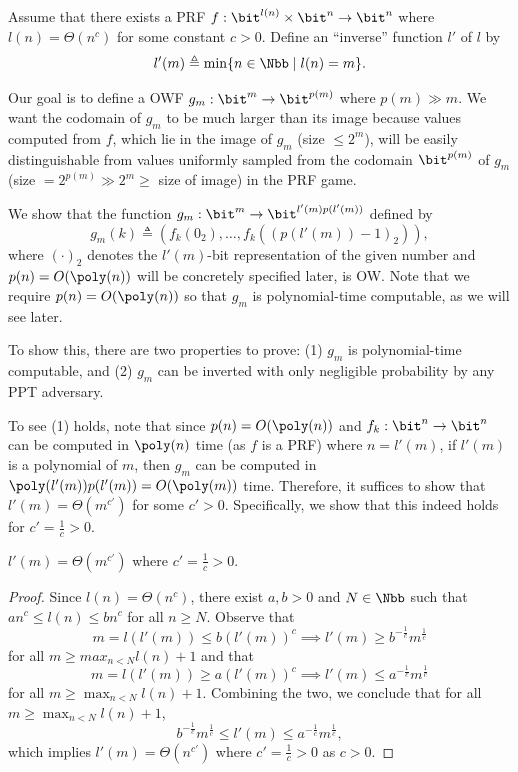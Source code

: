 \begin{answer}[a]
    Assume that there exists a PRF $f: \bit^{l(n)}\times \bit^n\to \bit^n$ where  $l(n)=\Theta(n^c)$ for some constant $c\gt 0$. Define an ``inverse'' function $l'$ of $l$ by
    \[
        l'(m)\triangleq \min\{n\in \Nbb \mid l(n)=m\}.
    \]

    \begin{intuition}
        Our goal is to define a OWF $g_m: \bit^m\to \bit^{p(m)}$ where $p(m)\gg m$. We want the codomain of $g_m$ to be much larger than its image because values computed from $f$, which lie in the image of $g_m$ (size $\le 2^m$), will be easily distinguishable from values uniformly sampled from the codomain $\bit^{p(m)}$ of $g_m$ (size $=2^{p(m)}\gg 2^{m}\ge$ size of image) in the PRF game. 
    \end{intuition}
    
    We show that the function $g_m:\bit^m\to \bit^{l'(m)p(l'(m))}$ defined by
    \[
        g_m(k) \triangleq  ({f}_{k}(0_2), \ldots , {f}_{k}((p(l'(m))-1)_2)),
    \]
    where $(\cdot)_2$ denotes the $l'(m)$-bit representation of the given number and $p(n)=O(\poly(n))$ will be concretely specified later, is OW. Note that we require $p(n)=O(\poly(n))$ so that $g_m$ is polynomial-time computable, as we will see later.

    To show this, there are two properties to prove: (1) $g_m$ is polynomial-time computable, and (2) $g_m$ can be inverted with only negligible probability by any PPT adversary. 

    To see (1) holds, note that since $p(n)=O(\poly(n))$ and $f_k:\bit^n\to\bit^n$ can be computed in $\poly(n)$ time (as $f$ is a PRF) where $n=l'(m)$, if $l'(m)$ is a polynomial of $m$, then $g_m$ can be computed in $\poly(l'(m))p(l'(m))=O(\poly(m))$ time. Therefore, it suffices to show that $l'(m)=\Theta(m^{c'})$ for some $c'\gt 0$. Specifically, we show that this indeed holds for $c'=\frac{1}{c}\gt 0$.
    \begin{claim}\label{claim:p3-1-1}
        $l'(m)=\Theta(m^{c'})$ where $c'=\frac{1}{c}\gt 0$.
    \end{claim}
    \begin{proof}
        Since $l(n)=\Theta(n^c)$, there exist $a,b\gt 0$ and $N\in\Nbb$ such that $an^c\le l(n)\le bn^c$ for all $n\ge N$. Observe that
        \[
            m=l(l'(m))\le b(l'(m))^c
            \implies  l'(m)\ge b^{-\frac{1}{c}} m^{\frac{1}{c}}
        \]
        for all $m\ge max_{n\lt N} l(n)+1$ and that
        \[
            m=l(l'(m))\ge a(l'(m))^c
            \implies  l'(m)\le a^{-\frac{1}{c}} m^{\frac{1}{c}}
        \]
        for all $m\ge \max_{n\lt N} l(n)+1$.
        Combining the two, we conclude that for all $m\ge \max_{n\lt N} l(n) +1$,
        \[
            b^{-\frac{1}{c}} m^{\frac{1}{c}}\le l'(m)\le a^{-\frac{1}{c}} m^{\frac{1}{c}},
        \] 
        which implies $l'(m)=\Theta(n^{c'})$ where $c'=\frac{1}{c}\gt 0$ as $c\gt 0$.
    \end{proof}



\end{answer}
